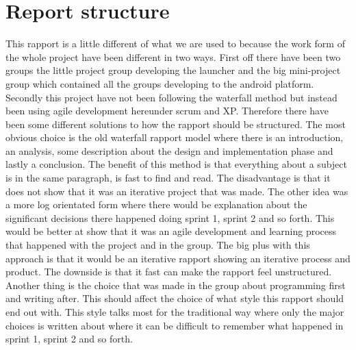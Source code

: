 \chapter{Report structure}

This rapport is a little different of what we are used to because the work form of the whole project have been different in two ways. First off there have been two groups the little project group developing the launcher and the big mini-project group which contained all the groups developing to the android platform. Secondly this project have not been following the waterfall method but instead been using agile development hereunder scrum and XP.
Therefore there have been some different solutions to how the rapport should be structured. The most obvious choice is the old waterfall rapport model where there is an introduction, an analysis, some description about the design and implementation phase and lastly a conclusion. The benefit of this method is that everything about a subject is in the same paragraph, is fast to find and read. The disadvantage is that it does not show that it was an iterative project that was made.
The other idea was a more log orientated form where there would be explanation about the significant decisions there happened doing sprint 1, sprint 2 and so forth. This would be better at show that it was an agile development and learning process that happened with the project and in the group. The big plus with this approach is that it would be an iterative rapport showing an iterative process and product. The downside is that it fast can make the rapport feel unstructured.
Another thing is the choice that was made in the group about programming first and writing after. This should affect the choice of what style this rapport should end out with. This style talks most for the traditional way where only the major choices is written about where it can be difficult to remember what happened in sprint 1, sprint 2 and so forth.